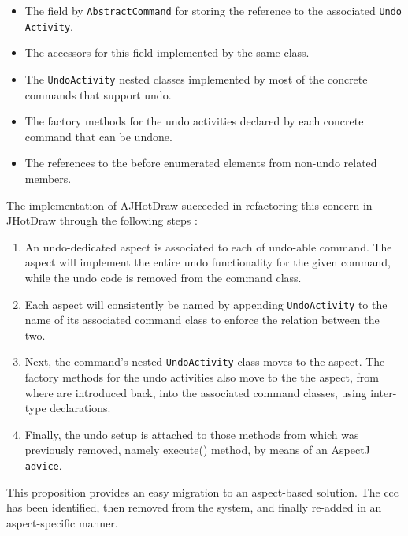 \begin{itemize}
	\item The field by \texttt{AbstractCommand} for storing the reference to the associated \texttt{Undo Activity}.

	\item The accessors for this field implemented by the same class.

	\item The \texttt{UndoActivity} nested classes implemented by most of the concrete commands that support undo.

	\item The factory methods for the undo activities declared by each concrete command that can be undone.
	
	\item The references to the before enumerated elements from non-undo related members.
\end{itemize}

The implementation of AJHotDraw succeeded in refactoring this concern in JHotDraw through the following steps \cite{marin2004refactoring}:

\begin{enumerate}

	\item An undo-dedicated aspect is associated to each of undo-able command. 
	The aspect will implement the entire undo functionality for the given command, while the undo code is removed from the command class.

 	\item Each aspect will consistently be named by appending \texttt{UndoActivity} to the name of its associated command class to enforce the relation between the two.

	\item Next, the command's nested \texttt{UndoActivity} class moves to the aspect. 
	The factory methods for the undo activities also move to the the aspect, from where are introduced back, into the associated command classes, using inter-type declarations.

	\item Finally, the undo setup is attached to those methods from which was previously removed, namely execute() method, by means of an AspectJ \texttt{advice}.

\end{enumerate}

This proposition \cite{marin2004refactoring} provides an easy migration to an aspect-based solution. 
The \ac{ccc} has been identified, then removed from the system, and finally re-added in an aspect-specific manner.

